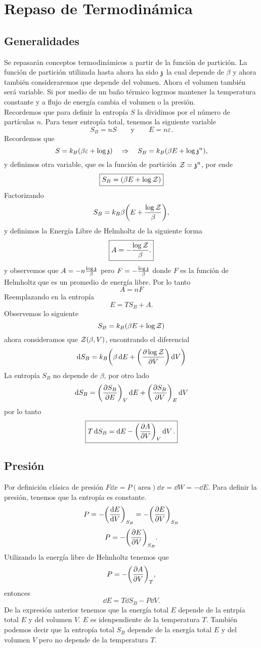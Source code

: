 \chapter{Repaso de Termodinámica}

\section{Generalidades}
Se repasarán conceptos termodinámicos a partir de la función de partición. La función de partición utilizada hasta ahora ha sido $\mathfrak{z}$ la cual depende de $\beta$ y ahora también consideraremos que depende del volumen. Ahora el volumen también será variable. Si por medio de un baño térmico logrmos mantener la temperatura constante y a flujo de energía cambia el volumen o la presión. \\

Recordemos que para definir la entropía $S$ la dividimos por el número de partículas $n$. Para tener entropía total, tenemos la siguiente variable
	$$ S_B = nS \qquad \text{y} \qquad E = n\varepsilon . $$
Recordemos que
	$$ S = k_B \qty(\beta \varepsilon + \log{\mathfrak{z}}) \quad \Rightarrow \quad S_B = k_B \qty(\beta E + \log{\mathfrak{z}^n}), $$
y definimos otra variable, que es la función de partición $\mathcal{Z} = \mathfrak{z} ^n$, por ende
	$$ \boxed{ S_B = \qty(\beta E + \log{\mathcal{Z}}) } $$
Factorizando
	$$ S_B = k_B \beta \qty(E + \frac{\log{\mathcal{Z}}}{\beta}), $$
y definimos la Energía Libre de Helmholtz de la siguiente forma
	$$ \boxed{ A = -\frac{\log{\mathcal{Z}}}{\beta} . } $$
y observemos que $A = -n\frac{\log{\mathfrak{z}}}{\beta}$ pero $F = -\frac{\log{\mathfrak{z}}}{\beta}$ donde $F$ es la función de Helmholtz que es un promedio de energía libre. Por lo tanto
	$$ \boxed{A = nF} $$
Reemplazando en la entropía
	$$ \boxed{E = TS_B + A.} $$
Observemos lo siguiente
	$$ S_B = k_B \qty(\beta E + \log{\mathcal{Z}}) $$
ahora consideramos que $\mathcal{Z} (\beta ,V)$, encontrando el diferencial
	$$ \dd{S_B} = k_B \qty(\beta \dd{E} + \qty(\pdv{\log{\mathcal{Z}}}{V}) \dd{V}) $$
La entropía $S_B$  no depende de $\beta$, por otro lado
	$$ \dd{S_B} = \qty(\pdv{S_B}{E})_V \dd{E} + \qty(\pdv{S_B}{V}) _E \dd{V} $$
por lo tanto
	$$ \boxed{ T\dd{S_B} = \dd{E} - \qty(\pdv{A}{V})_V \dd{V}. } $$


\section{Presión}
Por definición clásica de presión $F\dd{x} = P(\text{area}) \dd{x} = \dd{W} = -\dd{E}$. Para definir la presión, tenemos que la entropía es constante.
	$$ P = -\qty(\dv{E}{V}) _{S_B} = -\qty(\pdv{E}{V})_{S_B} $$
	$$ P = -\qty(\pdv{E}{V})_{S_B}. $$
Utilizando la energía libre de Helmholtz tenemos que
	$$ P = -\qty(\pdv{A}{V})_T, $$
entonces
	$$ \dd{E} = T\dd{S_B} - P\dd{V}. $$
De la expresión anterior tenemos que la energía total $E$ depende de la entrpía total $E$ y del volumen $V$. $E$ es idenpendiente de la temperatura $T$. También podemos decir que la entropía total $S_B$ depende de la energía total $E$ y del volumen $V$ pero no depende de la temperatura $T$. \\

